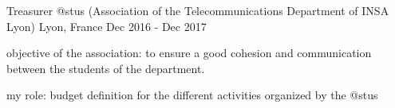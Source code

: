 

\begin{cventries}

  \cventry
    {Treasurer} %
    {@stus (Association of the Telecommunications Department of INSA Lyon)}  %
    {Lyon, France} %
    {Dec 2016 - Dec 2017} %
    {
      \begin{cvitems} %
        \item {objective of the association: to ensure a good cohesion and communication between the students of the department.}
        \item {my role: budget definition for the different activities organized by the @stus}
      \end{cvitems}
    }

\end{cventries}
